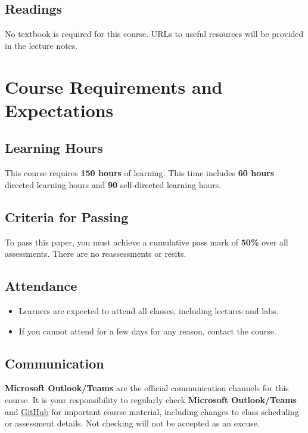 \documentclass{article}
\begin{document}
\subsection*{Readings}
No textbook is required for this course. URLs to useful resources will be provided in the lecture notes. 

\section*{Course Requirements and Expectations}

\subsection*{Learning Hours}
This course requires \textbf{150 hours} of learning. This time includes \textbf{60 hours} directed learning hours and \textbf{90} self-directed learning hours.  

\subsection*{Criteria for Passing}
To pass this paper, you must achieve a cumulative pass mark of \textbf{50\%} over all assessments. There are no reassessments or resits.

\subsection*{Attendance}
\begin{itemize}
	\item Learners are expected to attend all classes, including lectures and labs.
	\item If you cannot attend for a few days for any reason, contact the course.
\end{itemize}

\subsection*{Communication}
\textbf{Microsoft Outlook/Teams} are the official communication channels for this course. It is your responsibility to regularly check \textbf{Microsoft Outlook/Teams} and \href{https://github.com/otago-polytechnic-bit-courses/ID607001-intro-app-dev-concepts}{GitHub} for important course material, including changes to class scheduling or assessment details. Not checking will not be accepted as an excuse.
\end{document}
